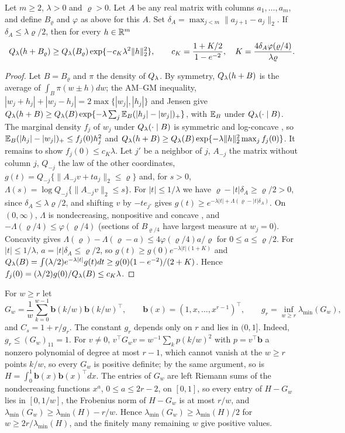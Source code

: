 \begin{lemma}\label{pf:lem:qshift}
Let $m\ge2$, $\lambda>0$ and $\varrho>0$. Let $A$ be any real matrix with columns $a_1,\dots,a_m$, and define $B_\varrho$ and $\varphi$ as above for this $A$. Set $\delta_A=\max_{j<m}\|a_{j+1}-a_j\|_2$. If $\delta_A\le\lambda\varrho/2$, then for every $h\in\mathbb{R}^m$
\[
Q_\lambda(h+B_\varrho)\ge Q_\lambda(B_\varrho)\exp\{-c_K\lambda^2\|h\|_2^2\},\qquad c_K=\frac{1+K/2}{1-e^{-2}},\quad K=\frac{4\delta_A\varphi(\varrho/4)}{\lambda\varrho}.
\]
\end{lemma}

\begin{proof}
Let $B=B_\varrho$ and $\pi$ the density of $Q_\lambda$. By symmetry, $Q_\lambda(h+B)$ is the average of $\int_B\pi(w\pm h)dw$; the AM--GM inequality, $|w_j+h_j|+|w_j-h_j|=2\max\{|w_j|,|h_j|\}$ and Jensen give $Q_\lambda(h+B)\ge Q_\lambda(B)\exp\{-\lambda\sum_j\mathbb{E}_B(|h_j|-|w_j|)_+\}$, with $\mathbb{E}_B$ under $Q_\lambda(\cdot\mid B)$. The marginal density $f_j$ of $w_j$ under $Q_\lambda(\cdot\mid B)$ is symmetric and log-concave \citep{prekopa1973logarithmic}, so $\mathbb{E}_B(|h_j|-|w_j|)_+\le f_j(0)h_j^2$ and
$Q_\lambda(h+B)\ge Q_\lambda(B)\exp\{-\lambda\|h\|_2^2\max_jf_j(0)\}$.
It remains to show $f_j(0)\le c_K\lambda$. Let $j'$ be a neighbor of $j$, $A_{-j}$ the matrix without column $j$, $Q_{-j}$ the law of the other coordinates, $g(t)=Q_{-j}\{\|A_{-j}v+ta_j\|_2\le\varrho\}$ and, for $s>0$, $\Lambda(s)=\log Q_{-j}\{\|A_{-j}v\|_2\le s\}$. For $|t|\le1/\lambda$ we have $\varrho-|t|\delta_A\ge\varrho/2>0$, since $\delta_A\le\lambda\varrho/2$, and shifting $v$ by $-te_{j'}$ gives $g(t)\ge e^{-\lambda|t|+\Lambda(\varrho-|t|\delta_A)}$. On $(0,\infty)$, $\Lambda$ is nondecreasing, nonpositive and concave \citep{prekopa1973logarithmic,borell1975convex}, and $-\Lambda(\varrho/4)\le\varphi(\varrho/4)$ (sections of $B_{\varrho/4}$ have largest measure at $w_j=0$). Concavity gives $\Lambda(\varrho)-\Lambda(\varrho-a)\le4\varphi(\varrho/4)a/\varrho$ for $0\le a\le\varrho/2$. For $|t|\le1/\lambda$, $a=|t|\delta_A\le\varrho/2$, so $g(t)\ge g(0)e^{-\lambda|t|(1+K)}$ and
$Q_\lambda(B)=\int(\lambda/2)e^{-\lambda|t|}g(t)dt\ge g(0)(1-e^{-2})/(2+K)$. Hence $f_j(0)=(\lambda/2)g(0)/Q_\lambda(B)\le c_K\lambda$.
\end{proof}

For $w\ge r$ let
\[
G_w=\frac1w\sum_{k=0}^{w-1}\mathbf b(k/w)\mathbf b(k/w)^\top,\qquad \mathbf b(x)=(1,x,\dots,x^{r-1})^\top,\qquad g_r=\inf_{w\ge r}\lambda_{\min}(G_w),
\]
and $C_s=1+r/g_r$. The constant $g_r$ depends only on $r$ and lies in $(0,1]$. Indeed, $g_r\le(G_w)_{11}=1$. For $v\ne0$, $v^\top G_wv=w^{-1}\sum_kp(k/w)^2$ with $p=v^\top\mathbf b$ a nonzero polynomial of degree at most $r-1$, which cannot vanish at the $w\ge r$ points $k/w$, so every $G_w$ is positive definite; by the same argument, so is $H=\int_0^1\mathbf b(x)\mathbf b(x)^\top dx$. The entries of $G_w$ are left Riemann sums of the nondecreasing functions $x^{a}$, $0\le a\le 2r-2$, on $[0,1]$, so every entry of $H-G_w$ lies in $[0,1/w]$, the Frobenius norm of $H-G_w$ is at most $r/w$, and $\lambda_{\min}(G_w)\ge\lambda_{\min}(H)-r/w$. Hence $\lambda_{\min}(G_w)\ge\lambda_{\min}(H)/2$ for $w\ge2r/\lambda_{\min}(H)$, and the finitely many remaining $w$ give positive values.

